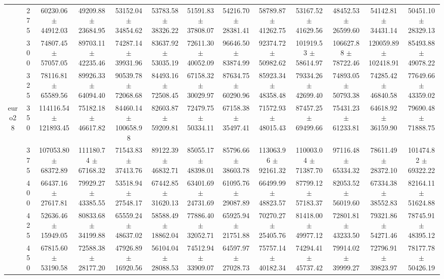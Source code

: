 \begin{table}[h]
{\begin{tabular}{
        ccccccccccccc}
 & 275& 60230.06 $\pm$ 44912.03& 49209.88 $\pm$ 23684.95& 53152.04 $\pm$ 34854.62& 53783.58 $\pm$ 38326.22& 51591.83 $\pm$ 37808.07& 54216.70 $\pm$ 28381.41& 58789.87 $\pm$ 41262.75& 53167.52 $\pm$ 41629.56& 48452.53 $\pm$ 26599.60& 54142.81 $\pm$ 34431.14& 50451.10 $\pm$ 28329.13 \\ 
 & 300& 74807.45 $\pm$ 57057.05& 89703.11 $\pm$ 42235.46& 74287.14 $\pm$ 39931.96& 83637.92 $\pm$ 53035.19& 72611.30 $\pm$ 40052.09& 96646.50 $\pm$ 83874.99& 92374.72 $\pm$ 50982.62& 101919.53 $\pm$ 58614.97& 106627.88 $\pm$ 78722.46& 120059.89 $\pm$ 102418.91& 85493.88 $\pm$ 49078.22 \\ 
 & 325& 78116.81 $\pm$ 65589.56& 89926.33 $\pm$ 64094.40& 90539.78 $\pm$ 72068.68& 84493.16 $\pm$ 72508.45& 67158.32 $\pm$ 30029.97& 87634.75 $\pm$ 60290.96& 85923.34 $\pm$ 48358.48& 79334.26 $\pm$ 42699.40& 74893.05 $\pm$ 50793.38& 74285.42 $\pm$ 46840.58& 77649.66 $\pm$ 43359.02 \\ 
\multirow{4}{*}{euro28}& 350& 114116.54 $\pm$ 121893.45& 75182.18 $\pm$ 46617.82& 84460.14 $\pm$ 100658.98& 82603.87 $\pm$ 59209.81& 72479.75 $\pm$ 50334.11& 67158.38 $\pm$ 35497.41& 71572.93 $\pm$ 48015.43& 87457.25 $\pm$ 69499.66& 75431.23 $\pm$ 61233.81& 64618.92 $\pm$ 36159.90& 79690.48 $\pm$ 71888.75 \\ 
 & 375& 107053.80 $\pm$ 68372.89& 111180.74 $\pm$ 67168.32& 71543.83 $\pm$ 37413.76& 89122.39 $\pm$ 46832.71& 85055.17 $\pm$ 48398.01& 85796.66 $\pm$ 38603.78& 113063.96 $\pm$ 92161.32& 110003.04 $\pm$ 71387.70& 97116.48 $\pm$ 65334.32& 78611.49 $\pm$ 28372.10& 101474.82 $\pm$ 69322.22 \\ 
 & 400& 66437.16 $\pm$ 27617.81& 79929.27 $\pm$ 43385.55& 53518.94 $\pm$ 27548.17& 67442.85 $\pm$ 31620.13& 63401.69 $\pm$ 24731.69& 61095.76 $\pm$ 29087.89& 66499.99 $\pm$ 48823.57& 87799.12 $\pm$ 57183.37& 82053.52 $\pm$ 56019.60& 67334.38 $\pm$ 38552.83& 82164.11 $\pm$ 51624.88 \\ 
 & 425& 52636.46 $\pm$ 15949.05& 80833.68 $\pm$ 34199.88& 65559.24 $\pm$ 48637.02& 58588.49 $\pm$ 18862.04& 77886.40 $\pm$ 32052.71& 65925.94 $\pm$ 21751.88& 70270.27 $\pm$ 25405.76& 81418.00 $\pm$ 49977.12& 72801.81 $\pm$ 43233.50& 79321.86 $\pm$ 54271.46& 78745.91 $\pm$ 48395.12 \\ 
 & 450& 67815.60 $\pm$ 53190.58& 72588.38 $\pm$ 28177.20& 47926.89 $\pm$ 16920.56& 56104.04 $\pm$ 28088.53& 74512.94 $\pm$ 33909.07& 64597.97 $\pm$ 27028.73& 75757.14 $\pm$ 40182.34& 74294.41 $\pm$ 45737.42& 79914.02 $\pm$ 39999.27& 72796.91 $\pm$ 39823.97& 78177.78 $\pm$ 50426.19 \\ 

\end{tabular}}
\end{table}
